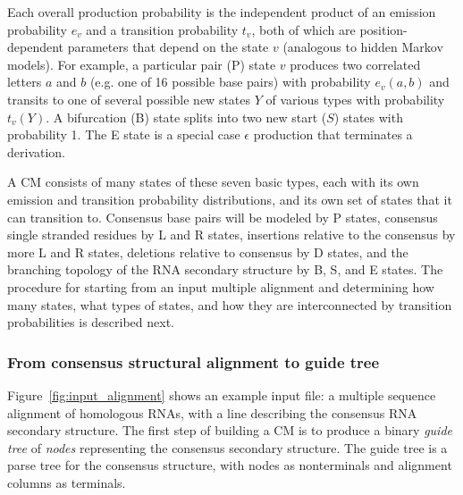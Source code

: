 \documentclass[11pt]{article}
\newif\ifdraft
\begin{document}
Each overall production probability is the independent product of an
emission probability $e_v$ and a transition probability $t_v$, both of
which are position-dependent parameters that depend on the state $v$
(analogous to hidden Markov models). For example, a particular pair
(P) state $v$ produces two correlated letters $a$ and $b$ (e.g. one of
16 possible base pairs) with probability $e_v(a,b)$ and transits to
one of several possible new states $Y$ of various types with
probability $t_v(Y)$.  A bifurcation (B) state splits into two new
start ($S$) states with probability 1.  The E state is a special case
$\epsilon$ production that terminates a derivation.

A CM consists of many states of these seven basic types, each with its
own emission and transition probability distributions, and its own set
of states that it can transition to. Consensus base pairs will be
modeled by P states, consensus single stranded residues by L and
R states, insertions relative to the consensus by more L and R
states, deletions relative to consensus by D states, and the
branching topology of the RNA secondary structure by B, S, and E
states. The procedure for starting from an input multiple alignment
and determining how many states, what types of states, and how they
are interconnected by transition probabilities is described next.

\subsubsection{From consensus structural alignment to guide tree}

Figure~\ref{fig:input_alignment} shows an example input file: a
multiple sequence alignment of homologous RNAs, with a line describing
the consensus RNA secondary structure. The first step of building a CM
is to produce a binary \emph{guide tree} of \emph{nodes} representing
the consensus secondary structure. The guide tree is a parse tree for
the consensus structure, with nodes as nonterminals and alignment
columns as terminals.

\ifdraft
\begin{figure}[t]
\begin{center}
\texttt{[image: Figures/input\_alignment]}
\end{center}
\caption{\textbf{An example RNA sequence family.} Top: a toy multiple
alignment of three sequences, with 28 total columns, 24 of which will
be modeled as consensus positions. The [structure] line annotates the
consensus secondary structure: $>$ and $<$ symbols mark base pairs,
x's mark consensus single stranded positions, and .'s mark
``insert'' columns that will not be considered part of the consensus
model. Bottom: the secondary structure of the ``human'' sequence.} 
\label{fig:input_alignment}
\end{figure}
\fi
\end{document}
